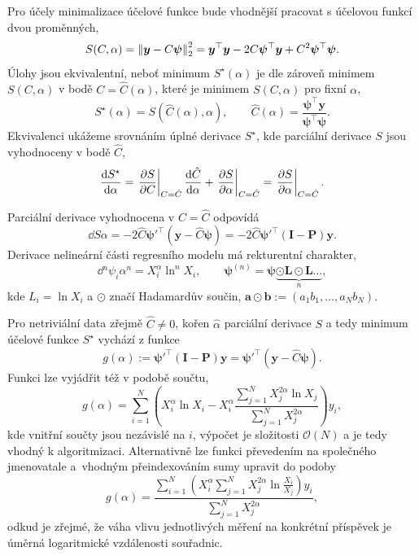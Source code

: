 Pro účely minimalizace účelové funkce bude vhodnější pracovat s účelovou funkcí dvou proměnných,
\begin{equation}
    S(C,\alpha)=\left\lVert\bm{y}-C\bm{\psi}\right\rVert_2^2=\bm{y}^\top\bm{y}-2C\bm{\psi}^\top\bm{y}+C^2\bm{\psi}^\top\bm{\psi}.
\end{equation}
Úlohy jsou ekvivalentní, neboť minimum $S^\star(\alpha)$ je dle  zároveň minimem $S(C,\alpha)$ v bodě $C=\hat{C}(\alpha)$, které je minimem $S(C,\alpha)$ pro fixní $\alpha$,
\begin{equation}\label{eq:C_hat_linear_regression_solution}
    S^\star(\alpha)=S(\hat{C}(\alpha),\alpha),\qquad \hat{C}(\alpha)=\frac{\bm{\psi}^\top\bm{y}}{\bm{\psi}^\top\bm{\psi}}.
\end{equation}
Ekvivalenci ukážeme srovnáním úplné derivace $S^\star$, kde parciální derivace $S$ jsou vyhodnoceny v bodě $\hat{C}$, 
\begin{equation}
    \frac{\mathrm{d} S^\star}{\mathrm{d} \alpha}=\left.\frac{\partial S}{\partial C}\right|_{C=\hat{C}}\frac{\mathrm{d} \hat{C}}{\mathrm{d} \alpha}+\left.\frac{\partial S}{\partial \alpha}\right|_{C=\hat{C}}=\left.\frac{\partial S}{\partial \alpha}\right|_{C=\hat{C}}.
\end{equation}

Parciální derivace vyhodnocena v $C=\hat{C}$ odpovídá
\begin{equation}
    \dd{S}{\alpha}=-2\hat{C}\bm{\psi}'^\top\left(\bm{y}-\hat{C}\bm{\psi}\right)=-2\hat{C}\bm{\psi}'^\top(\mathbf{I}-\mathbf{P})\bm{y}.
\end{equation}
Derivace nelineární části regresního modelu má rekturentní charakter,
\begin{equation}
    \dd{^n\psi_i}{\alpha^n}=X_i^\alpha \ln^n{\!X_i},\qquad\bm{\psi}^{(n)}=\bm{\psi}\underbrace{\odot\bm{L}\odot\bm{L}\dots}_{n},
\end{equation}
kde $L_i=\ln{X_i}$ a $\odot$ značí Hadamardův součin, $\bm{a}\odot\bm{b}:=(a_1b_1, \dots,a_N b_N)$.

Pro netriviální data zřejmě $\hat{C}\neq0$, kořen $\hat{\alpha}$ parciální derivace $S$ a tedy minimum účelové funkce $S^\star$ vychází z funkce
\begin{equation}
    g(\alpha):=\bm{\psi}'^\top(\mathbf{I}-\mathbf{P})\bm{y}=\bm{\psi}'^\top(\bm{y}-\hat{C}\bm{\psi}).
\end{equation}
Funkci lze vyjádřit též v podobě součtu,
\begin{equation}
    g(\alpha)=\sum_{i=1}^{N}\left(X_i^\alpha \ln{X_i}-X_i^\alpha\frac{\sum_{j=1}^{N}X_j^{2\alpha}\ln{X_j}}{\sum_{j=1}^{N}X_j^{2\alpha}}\right)y_i,
\end{equation}
kde vnitřní součty jsou nezávislé na $i$, výpočet je složitosti $\mathcal{O}(N)$ a je tedy vhodný k algoritmizaci. Alternativně lze funkci převedením na společného jmenovatale a~vhodným přeindexováním sumy upravit do podoby
\begin{equation}
    g(\alpha)=\frac{\sum_{i=1}^{N}\left(X_i^\alpha\sum_{j=1}^{N}X_j^{2\alpha}\ln{\frac{X_i}{X_j}}\right)y_i}{\sum_{j=1}^{N}X_j^{2\alpha}},
\end{equation}
odkud je zřejmé, že váha vlivu jednotlivých měření na konkrétní příspěvek je úměrná logaritmické vzdálenosti souřadnic. 

